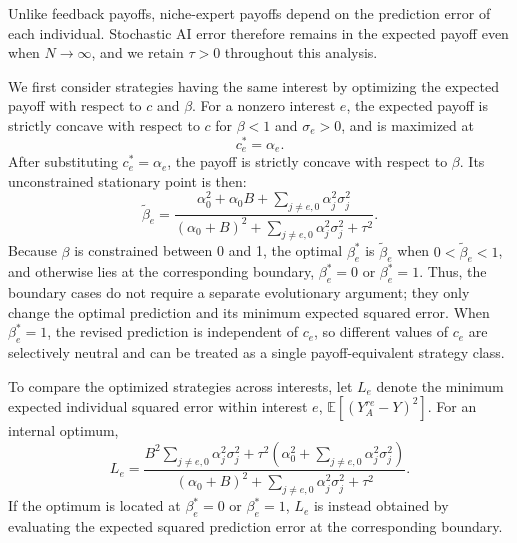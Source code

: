 \documentclass[12pt]{article}
\begin{document}
Unlike feedback payoffs, niche-expert payoffs depend on the prediction error of each individual. 
Stochastic AI error therefore remains in the expected payoff even when $N\to\infty$, and we retain $\tau>0$ throughout this analysis.

We first consider strategies having the same interest by optimizing the expected payoff with respect to $c$ and $\beta$.
For a nonzero interest $e$, the expected payoff is strictly concave with respect to $c$ for $\beta<1$ and $\sigma_e>0$, and is maximized at
\begin{equation}
c_e^*=\alpha_e.
\end{equation}
After substituting $c_e^*=\alpha_e$, the payoff is strictly concave with respect to $\beta$.
Its unconstrained stationary point is then:
\begin{equation}
\tilde{\beta}_e = \frac{\alpha_0^2+\alpha_0B+\sum_{j\neq e,0}\alpha_j^2\sigma_j^2}{(\alpha_0+B)^2+\sum_{j\neq e,0}\alpha_j^2\sigma_j^2+\tau^2}.
\end{equation}
Because $\beta$ is constrained between 0 and 1, the optimal $\beta_e^*$ is $\tilde{\beta}_e$ when $0<\tilde{\beta}_e<1$, and otherwise lies at the corresponding boundary, $\beta_e^*=0$ or $\beta_e^*=1$.
Thus, the boundary cases do not require a separate evolutionary argument; they only change the optimal prediction and its minimum expected squared error.
When $\beta_e^*=1$, the revised prediction is independent of $c_e$, so different values of $c_e$ are selectively neutral and can be treated as a single payoff-equivalent strategy class.

To compare the optimized strategies across interests, let $L_e$ denote the minimum expected individual squared error within interest $e$, $\mathbb{E}[(Y_A^{re}-Y)^2]$.
For an internal optimum,
\begin{equation}
L_e=\frac{B^2\sum_{j\neq e,0}\alpha_j^2\sigma_j^2+\tau^2\left(\alpha_0^2+\sum_{j\neq e,0}\alpha_j^2\sigma_j^2\right)}{(\alpha_0+B)^2+\sum_{j\neq e,0}\alpha_j^2\sigma_j^2+\tau^2}.
\end{equation}
If the optimum is located at $\beta_e^*=0$ or $\beta_e^*=1$, $L_e$ is instead obtained by evaluating the expected squared prediction error at the corresponding boundary.
\end{document}
